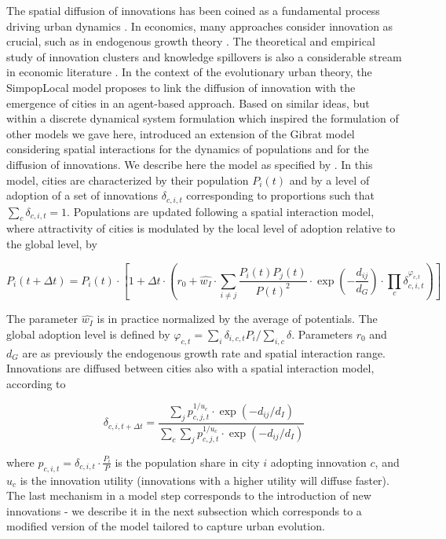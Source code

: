 \documentclass[10pt,letterpaper]{article}
\begin{document}
The spatial diffusion of innovations has been coined as a fundamental process driving urban dynamics \citep{hagerstrand1968innovation}. In economics, many approaches consider innovation as crucial, such as in endogenous growth theory \citep{aghion1998endogenous}. The theoretical and empirical study of innovation clusters and knowledge spillovers is also a considerable stream in economic literature \citep{audretsch2005does}. In the context of the evolutionary urban theory, the SimpopLocal model \citep{schmitt2014modelisation} proposes to link the diffusion of innovation with the emergence of cities in an agent-based approach. Based on similar ideas, but within a discrete dynamical system formulation which inspired the formulation of other models we gave here,  \cite{favaro2011gibrat} introduced an extension of the Gibrat model considering spatial interactions for the dynamics of populations and for the diffusion of innovations. We describe here the model as specified by \citep{raimbault2020model}. In this model, cities are characterized by their population $P_i(t)$ and by a level of adoption of a set of innovations $\delta_{c,i,t}$ corresponding to proportions such that $\sum_c \delta_{c,i,t} = 1$. Populations are updated following a spatial interaction model, where attractivity of cities is modulated by the local level of adoption relative to the global level, by

\begin{equation}
	P_i (t+\Delta t) = P_i(t) \cdot \left[1 + \Delta t \cdot \left(r_0 + \hat{w_I} \cdot \sum_{i\neq j} \frac{P_i(t) P_j(t)}{P(t)^2} \cdot \exp \left(- \frac{d_{ij}}{d_G} \right) \cdot \prod_c \delta_{c,i,t}^{\varphi_{c,t}} \right) \right]
\end{equation}


The parameter $\hat{w_I}$ is in practice normalized by the average of potentials. The global adoption level is defined by $\varphi_{c,t} = \sum_i \delta_{i,c,t} P_i / \sum_{i,c} \delta$. Parameters $r_0$ and $d_G$ are as previously the endogenous growth rate and spatial interaction range. Innovations are diffused between cities also with a spatial interaction model, according to

\begin{equation}
	\delta_{c,i,t+\Delta t} = \frac{\sum_j p_{c,j,t}^{1/u_c}\cdot \exp\left(-d_{ij}/d_I\right)}{\sum_c\sum_j p_{c,j,t}^{1/u_c}\cdot \exp\left(-d_{ij}/d_I\right)}	
\end{equation}

where $p_{c,i,t} = \delta_{c,i,t}\cdot \frac{P_i}{P}$ is the population share in city $i$ adopting innovation $c$, and $u_c$ is the innovation utility (innovations with a higher utility will diffuse faster). The last mechanism in a model step corresponds to the introduction of new innovations - we describe it in the next subsection which corresponds to a modified version of the model tailored to capture urban evolution.
\end{document}
